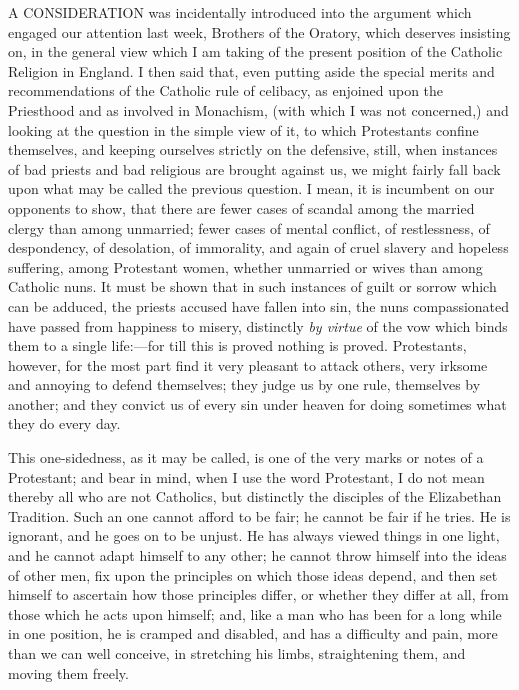 A CONSIDERATION was incidentally introduced into the
argument which engaged our attention last week, Brothers
of the Oratory, which deserves insisting on, in the
general view which I am taking of the present position of
the Catholic Religion in England. I then said that, even
putting aside the special merits and recommendations of
the Catholic rule of celibacy, as enjoined upon the
Priesthood and as involved in Monachism, (with which I
was not concerned,) and looking at the question in the
simple view of it, to which Protestants confine
themselves, and keeping ourselves strictly on the
defensive, still, when instances of bad priests and bad
religious are brought against us, we might fairly fall
back upon what may be called the previous question. I
mean, it is incumbent on our opponents to show, that
there are fewer cases of scandal among the married clergy
than among unmarried; fewer cases of mental conflict, of
restlessness, of despondency, of desolation, of
immorality, and again of cruel slavery and hopeless
suffering, among Protestant women, whether unmarried or
wives than among Catholic nuns. It must be shown that in
such instances of guilt or sorrow which can be adduced,
the priests accused have fallen into sin, the nuns
compassionated have passed from happiness to misery,
distinctly \emph{by virtue} of the vow which binds them to a
single life:—for till this is proved nothing is
proved. Protestants, however, for the most part find it
very pleasant to attack others, very irksome and annoying
to defend themselves; they judge us by one rule,
themselves by another; and they convict us of every sin
under heaven for doing sometimes what they do every day.

This one-sidedness, as it may be called, is one of the
very marks or notes of a Protestant; and bear in mind,
when I use the word Protestant, I do not mean thereby all
who are not Catholics, but distinctly the disciples of
the Elizabethan Tradition. Such an one cannot afford to
be fair; he cannot be fair if he tries. He is ignorant,
and he goes on to be unjust. He has always viewed things
in one light, and he cannot adapt himself to any other;
he cannot throw himself into the ideas of other men, fix
upon the principles on which those ideas depend, and then
set himself to ascertain how those principles differ, or
whether they differ at all, from those which he acts upon
himself; and, like a man who has been for a long while in
one position, he is cramped and disabled, and has a
difficulty and pain, more than we can well conceive, in
stretching his limbs, straightening them, and moving them
freely.

